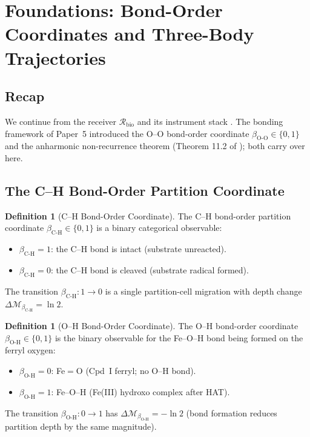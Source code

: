 \documentclass[11pt,twocolumn,a4paper]{article}
\theoremstyle{definition}
\newtheorem{definition}[theorem]{Definition}
\theoremstyle{remark}
\newcommand{\Recv}{\mathcal{R}}
\newcommand{\depth}{\mathcal{M}}
\newcommand{\betaCH}{\beta_{\mathrm{C\text{-}H}}}
\newcommand{\betaOH}{\beta_{\mathrm{O\text{-}H}}}
\begin{document}
\section{Foundations: Bond-Order Coordinates and Three-Body Trajectories}
\label{sec:foundations}

\subsection{Recap}

We continue from the receiver $\Recv_{\mathrm{bio}}$ \citep{sachikonye2025_paper1}
and its instrument stack \citep{sachikonye2025_paper4}. The bonding framework
of Paper~5 \citep{sachikonye2025_paper5} introduced the O--O bond-order
coordinate $\beta_{\mathrm{O\text{-}O}} \in \{0,1\}$ and the anharmonic
non-recurrence theorem (Theorem 11.2 of \citep{sachikonye2025_isomorphism});
both carry over here.

\subsection{The C--H Bond-Order Partition Coordinate}

\begin{definition}[C--H Bond-Order Coordinate]
\label{def:ch_bond_order}
The C--H bond-order partition coordinate $\betaCH \in \{0, 1\}$ is a binary
categorical observable:
\begin{itemize}[nosep]
\item $\betaCH = 1$: the C--H bond is intact (substrate unreacted).
\item $\betaCH = 0$: the C--H bond is cleaved (substrate radical formed).
\end{itemize}
The transition $\betaCH: 1 \to 0$ is a single partition-cell migration with
depth change $\Delta\depth_{\betaCH} = \ln 2$.
\end{definition}

\begin{definition}[O--H Bond-Order Coordinate]
\label{def:oh_bond_order}
The O--H bond-order coordinate $\betaOH \in \{0, 1\}$ is the binary observable
for the Fe--O--H bond being formed on the ferryl oxygen:
\begin{itemize}[nosep]
\item $\betaOH = 0$: Fe$=\!$O (Cpd~I ferryl; no O--H bond).
\item $\betaOH = 1$: Fe--O--H (Fe(III) hydroxo complex after HAT).
\end{itemize}
The transition $\betaOH: 0 \to 1$ has $\Delta\depth_{\betaOH} = -\ln 2$
(bond formation reduces partition depth by the same magnitude).
\end{definition}
\end{document}
